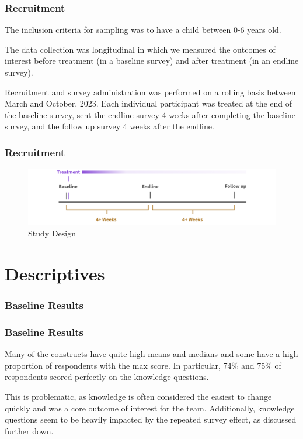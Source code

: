\documentclass[aspectratio=169]{beamer}
\begin{document}
\begin{frame}
  \frametitle{Recruitment}

The inclusion criteria for sampling was to have a child between 0-6 years old. 

The data collection was longitudinal in which we measured the outcomes of interest before treatment (in a baseline survey) and after treatment (in an endline survey). 

Recruitment and survey administration was performed on a rolling basis between March and October, 2023. Each individual participant was treated at the end of the baseline survey, sent the endline survey 4 weeks after completing the baseline survey, and the follow up survey 4 weeks after the endline.

\end{frame}


\begin{frame}
  \frametitle{Recruitment}


  \begin{figure}[H]
\includegraphics[width=\textwidth]{../images/design-timeline.png}
\caption{Study Design}
\label{fig:Study Design}
\end{figure}

\end{frame}

\section{Descriptives} 

\begin{frame}[shrink=10]
  \frametitle{Baseline Results}

  

\end{frame}


\begin{frame}
    \frametitle{Baseline Results}

  Many of the constructs have quite high means and medians and some have a high proportion of respondents with the max score. In particular, 74\% and 75\% of respondents scored perfectly on the knowledge questions. 

This is problematic, as knowledge is often considered the easiest to change quickly and was a core outcome of interest for the team. Additionally, knowledge questions seem to be heavily impacted by the repeated survey effect, as discussed further down. 
\end{frame}
\end{document}

